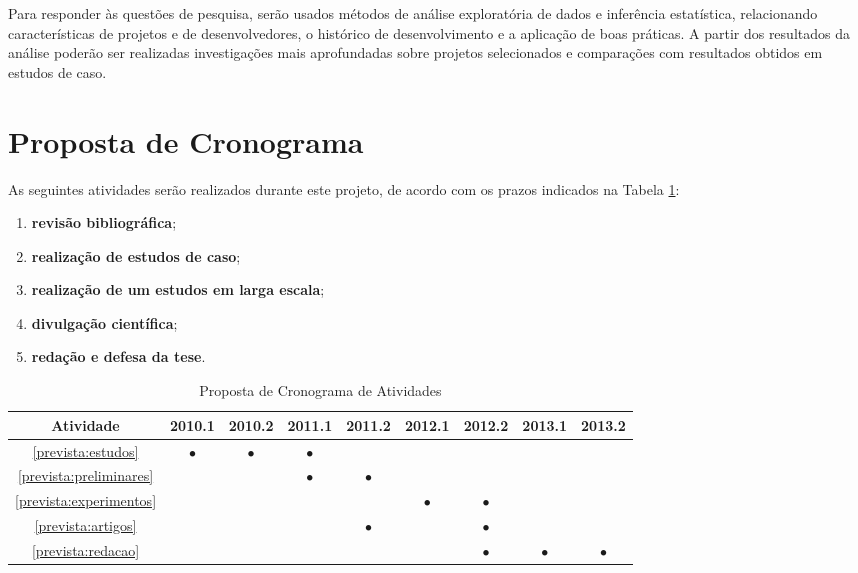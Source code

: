 \documentclass{article}
\begin{document}
Para responder às questões de pesquisa, serão usados métodos de análise
exploratória de dados e inferência estatística, relacionando características de
projetos e de desenvolvedores, o histórico de desenvolvimento e a aplicação de
boas práticas. A partir dos resultados da análise poderão ser realizadas
investigações mais aprofundadas sobre projetos selecionados e comparações com
resultados obtidos em estudos de caso.


\section{Proposta de Cronograma}
\newcommand{\newrow}{\\\hline}
\newcommand{\x}{$\bullet$}

As seguintes atividades serão realizados durante este projeto, de acordo com os
prazos indicados na Tabela \ref{tab:cronograma}:

\begin{enumerate}
  \item \label{prevista:estudos}
    \textbf{revisão bibliográfica};
  \item \label{prevista:preliminares}
    \textbf{realização de estudos de caso};
  \item \label{prevista:experimentos}
    \textbf{realização de um estudos em larga escala};
  \item \label{prevista:artigos}
    \textbf{divulgação científica};
  \item \label{prevista:redacao}
    \textbf{redação e defesa da tese}.
\end{enumerate}

\begin{table}[h]
  \centering
  \begin{tabular}{|c|c|c|c|c|c|c|c|c|} \hline
    Atividade                   & 2010.1 & 2010.2 & 2011.1 & 2011.2  & 2012.1 & 2012.2  & 2013.1 & 2013.2 \newrow
    \ref{prevista:estudos}      & \x     & \x     & \x     &         &        &         &        &        \newrow
    \ref{prevista:preliminares} &        &        & \x     & \x      &        &         &        &        \newrow
    \ref{prevista:experimentos} &        &        &        &         & \x     & \x      &        &        \newrow
    \ref{prevista:artigos}      &        &        &        & \x      &        & \x      &        &        \newrow
    \ref{prevista:redacao}      &        &        &        &         &        & \x      & \x     & \x     \newrow
  \end{tabular}
 \caption{Proposta de Cronograma de Atividades}
 \label{tab:cronograma}
\end{table}




\end{document}
